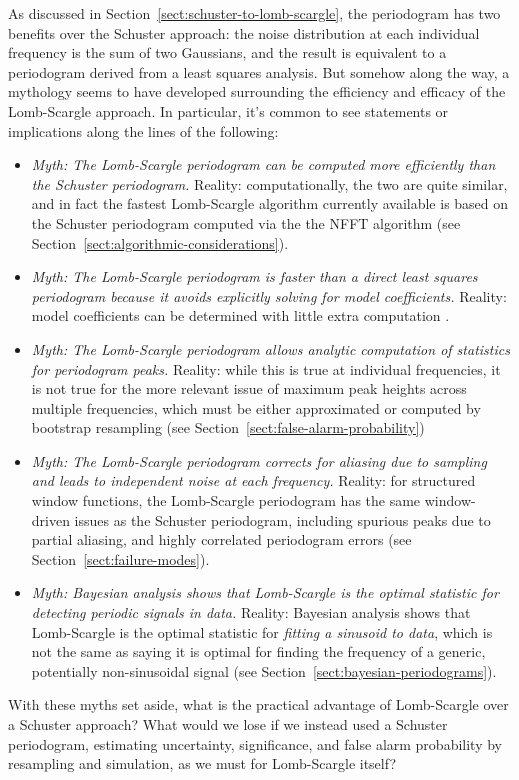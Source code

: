 \documentclass[preprint]{aastex}
\newcommand{\Sect}[1]{Section~\ref{sect:#1}}
\newcommand{\sect}[1]{\Sect{#1}}
\begin{document}
As discussed in \sect{schuster-to-lomb-scargle}, the periodogram has two
benefits over the Schuster approach:
the noise distribution at each individual frequency is the sum
of two Gaussians, and the result is equivalent to a periodogram derived
from a least squares analysis.
But somehow along the way, a mythology seems to have developed surrounding
the efficiency and efficacy of the Lomb-Scargle approach. In particular,
it's common to see statements or implications along the lines of the following:
\begin{itemize}
  \item {\it Myth: The Lomb-Scargle periodogram can be computed more efficiently
    than the Schuster periodogram.} Reality: computationally, the two
    are quite similar, and in fact the fastest Lomb-Scargle algorithm currently
    available is based on the Schuster periodogram computed via the
    the NFFT algorithm (see \sect{algorithmic-considerations}).
  \item {\it Myth: The Lomb-Scargle periodogram is faster than a direct
    least squares periodogram because it avoids explicitly solving for
    model coefficients.}
    Reality: model coefficients can be determined with little extra
    computation \citep[see the discussion in][]{ICVG2014}.
  \item {\it Myth: The Lomb-Scargle periodogram allows analytic computation of
    statistics for periodogram peaks.} Reality: while this is true at
    individual frequencies, it is not true for the more relevant issue of
    maximum peak heights across multiple frequencies,
    which must be either approximated
    or computed by bootstrap resampling (see \sect{false-alarm-probability})
  \item {\it Myth: The Lomb-Scargle periodogram corrects for aliasing due to
    sampling and leads to independent noise at each frequency.}
    Reality: for structured window functions, the Lomb-Scargle
    periodogram has the same window-driven issues as the Schuster
    periodogram, including spurious peaks due to partial aliasing, and
    highly correlated periodogram errors (see \sect{failure-modes}).
  \item {\it Myth: Bayesian analysis shows that Lomb-Scargle is the optimal
    statistic for detecting periodic signals in data.} Reality: Bayesian
    analysis shows that Lomb-Scargle is the optimal statistic for
    {\it fitting a sinusoid to data}, which is not the same as saying it
    is optimal for finding the frequency of a generic, potentially
    non-sinusoidal signal (see \sect{bayesian-periodograms}).
\end{itemize}
With these myths set aside, what is the practical advantage of Lomb-Scargle
over a Schuster approach?
What would we lose if we instead used a Schuster periodogram,
estimating uncertainty, significance, and false alarm probability by
resampling and simulation, as we must for Lomb-Scargle itself?
\end{document}
